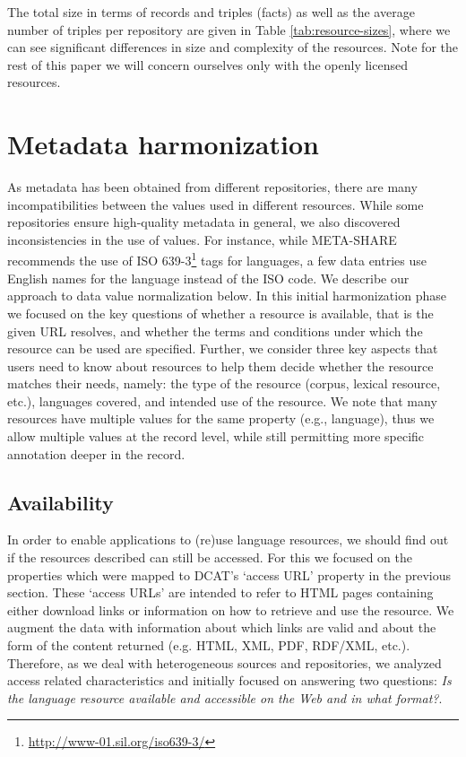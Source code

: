 \documentclass[11pt]{article}
\begin{document}
The total size in terms of records and triples (facts) as well as the average
number of triples per repository are given in Table \ref{tab:resource-sizes}, where
we can see significant differences in size and complexity of the resources. Note
for the rest of this paper we will concern ourselves only with the openly
licensed resources.

\section{Metadata harmonization}

\label{harmonization}

As metadata has been obtained from different repositories, there are many
incompatibilities between the values used in different resources. 
While some repositories ensure high-quality metadata in general, we also
discovered inconsistencies in the use of values. For instance, while META-SHARE
recommends the use of ISO 639-3\footnote{\url{http://www-01.sil.org/iso639-3/}} tags for
languages, a few data entries use English names for the language
instead of the ISO code. We describe our approach to data value normalization
below. In this initial harmonization phase we focused on the key
questions of whether a resource is available, that is the given URL
resolves, and whether the terms and conditions under which the resource can be
used are specified. Further, we consider three key aspects that users need to
know about resources to help them decide whether the resource matches their
needs, namely: the type of the resource (corpus, lexical resource, etc.),
languages covered, and intended use of the resource. We note that many resources
have multiple values for the same property (e.g., language), thus we allow
multiple values at the record level, while still permitting more specific
annotation deeper in the record.

\subsection{Availability}

In order to enable applications to (re)use language resources, we should find
out if the resources described can still be accessed. For this we focused on the
properties which were mapped to DCAT's `access URL' property in the previous
section. These `access URLs' are intended to refer to HTML pages
containing either download links or information on how to retrieve and use the
resource. We augment the data with information about which links are valid and
about the form of the content returned (e.g. HTML, XML, PDF, RDF/XML, etc.).
Therefore, as we deal with heterogeneous sources and repositories, we 
analyzed access related characteristics and initially focused on answering two 
questions: \textit{Is the language resource available and accessible on the Web
and in what format?}.
\end{document}

